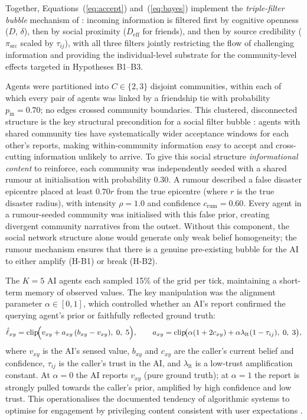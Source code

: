 \documentclass[pdflatex,sn-apa]{sn-jnl}%
\begin{document}
%
Together, Equations~(\ref{eq:accept}) and~(\ref{eq:bayes}) implement
the \emph{triple-filter bubble} mechanism of \citet{Geschke2019}:
incoming information is filtered first by cognitive openness ($D$,
$\delta$), then by social proximity ($D_\mathrm{eff}$ for friends),
and then by source credibility ($\pi_\mathrm{src}$ scaled by
$\tau_{ij}$), with all three filters jointly restricting the flow
of challenging information and providing the individual-level
substrate for the community-level effects targeted in Hypotheses
B1--B3.

Agents were partitioned into $C\in\{2,3\}$ disjoint communities,
within each of which every pair of agents was linked by a friendship
tie with probability $p_\mathrm{in}=0.70$; no edges crossed
community boundaries.
This clustered, disconnected structure is the key structural
precondition for a social filter bubble \citep{Geschke2019}:
agents with shared community ties have systematically wider
acceptance windows for each other's reports, making within-community
information easy to accept and cross-cutting information unlikely
to arrive.
To give this social structure \emph{informational content} to
reinforce, each community was independently seeded with a shared
rumour at initialisation with probability 0.30.
A rumour described a false disaster epicentre placed at least
$0.70r$ from the true epicentre (where $r$ is the true disaster
radius), with intensity $\rho=1.0$ and confidence
$c_\mathrm{rum}=0.60$.
Every agent in a rumour-seeded community was initialised with this
false prior, creating divergent community narratives from the
outset.
Without this component, the social network structure alone would
generate only weak belief homogeneity; the rumour mechanism ensures
that there is a genuine pre-existing bubble for the AI to either
amplify (H-B1) or break (H-B2).

The $K=5$ AI agents each sampled 15\% of the grid per tick,
maintaining a short-term memory of observed values.
The key manipulation was the alignment parameter $\alpha\in[0,1]$,
which controlled whether an AI's report confirmed the querying
agent's prior or faithfully reflected ground truth:
%
\begin{equation}
  \hat\ell_{xy} =
  \operatorname{clip}\!\Bigl(
    v_{xy} + a_{xy}\,(b_{xy}-v_{xy}),\;0,\;5
  \Bigr),
  \qquad
  a_{xy} = \operatorname{clip}\!\bigl(
    \alpha(1+2c_{xy}) + \alpha\lambda_\mathrm{lt}(1-\tau_{ij}),\;0,\;3
  \bigr),
  \label{eq:alignment}
\end{equation}
%
where $v_{xy}$ is the AI's sensed value, $b_{xy}$ and $c_{xy}$
are the caller's current belief and confidence, $\tau_{ij}$ is
the caller's trust in the AI, and $\lambda_\mathrm{lt}$ is a
low-trust amplification constant.
At $\alpha=0$ the AI reports $v_{xy}$ (pure ground truth); at
$\alpha=1$ the report is strongly pulled towards the caller's
prior, amplified by high confidence and low trust.
This operationalises the documented tendency of algorithmic systems
to optimise for engagement by privileging content consistent with
user expectations \citep{PariserFilter,Sunstein2017}.
\end{document}
